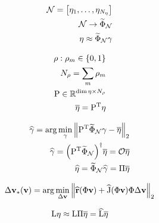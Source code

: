 \begin{align}
    \mathcal{N} =
    \begin{bmatrix}
        \nlin_1, \dots,  \nlin_{N_\nlin}
    \end{bmatrix} \\
    \mathcal{N} \rightarrow \widetilde{\Phi}_\mathcal{N} \\
    \nlin \approx \widetilde{\Phi}_\mathcal{N} \bvec{\gamma}
\end{align}

\begin{align}
   \bvec{\rho} : \rho_m \in \left\{0, 1 \right\} \\
   N_{\bvec{\rho}} = \sum_m \rho_m \\
   \matr{P} \in \mathbb{R}^{\dim{\nlin} \times N_{\bvec{\rho}}} \\
   \overline{\nlin} = \transpose{P} \nlin
\end{align}

\begin{align}
    \widehat{\bvec{\gamma}} = \arg \min_{\bvec{\gamma}} \norm[2]{\transpose{P} \widetilde{\Phi}_\mathcal{N} \bvec{\gamma} - \overline{\nlin}} \\
    \widehat{\bvec{\gamma}} = {\left( \transpose{P} \widetilde{\Phi}_\mathcal{N} \right)}^\dagger \overline{\nlin} = \mathcal{O} \overline{\nlin} \\
    \widehat{\nlin} = \widetilde{\Phi}_\mathcal{N} \widehat{\bvec{\gamma}} = \matr{\Pi} \overline{\nlin}
\end{align}


\begin{align}
    \dvunk_\ast (\vunk)= \arg \min_{\dvunk} \norm[2]{\widehat{\resid}(\Phi \vunk) + \widehat{\jac}(\Phi \vunk) \Phi \dvunk}
\end{align}

\begin{align}
    \matr{\matr{L}} \nlin \approx
    \matr{\matr{L}} \matr{\Pi} \overline{\nlin} = \widehat{\matr{\matr{L}}} \overline{\nlin}
\end{align}

\begin{figure}[ht]
    \caption{ \cite{Elizarev2022}}\label{fig:ROM-II}
\end{figure}

